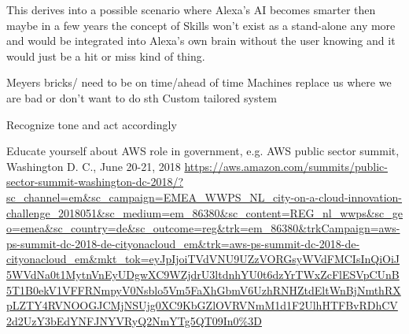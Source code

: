 




This derives into a possible scenario where Alexa's AI becomes smarter then maybe in a few years the concept of Skills won't exist as a stand-alone any more and would be integrated into Alexa's own brain without the user knowing and it would just be a hit or miss kind of thing.



Meyers bricks/ need to be on time/ahead of time
Machines replace us where we are bad or don’t want to do sth
Custom tailored system


Recognize tone and act accordingly 







Educate yourself about AWS role in government, e.g. 
AWS public sector summit, Washington D. C., June 20-21, 2018
\url{https://aws.amazon.com/summits/public-sector-summit-washington-dc-2018/?sc_channel=em&sc_campaign=EMEA_WWPS_NL_city-on-a-cloud-innovation-challenge_2018051&sc_medium=em_86380&sc_content=REG_nl_wwps&sc_geo=emea&sc_country=de&sc_outcome=reg&trk=em_86380&trkCampaign=aws-ps-summit-dc-2018-de-cityonacloud_em&trk=aws-ps-summit-dc-2018-de-cityonacloud_em&mkt_tok=eyJpIjoiTVdVNU9UZzVORGsyWVdFMCIsInQiOiJ5WVdNa0t1MytnVnEyUDgwXC9WZjdrU3ltdnhYU0t6dzYrTWxZcFlESVpCUnB5T1B0ekV1VFFRNmpyV0Nsblo5Vm5FaXhGbmV6UzhRNHZtdEltWnBjNmthRXpLZTY4RVNOOGJCMjNSUjg0XC9KbGZlOVRVNmM1d1F2UlhHTFBvRDhCV2d2UzY3bEdYNFJNYVRyQ2NmYTg5QT09In0%3D}